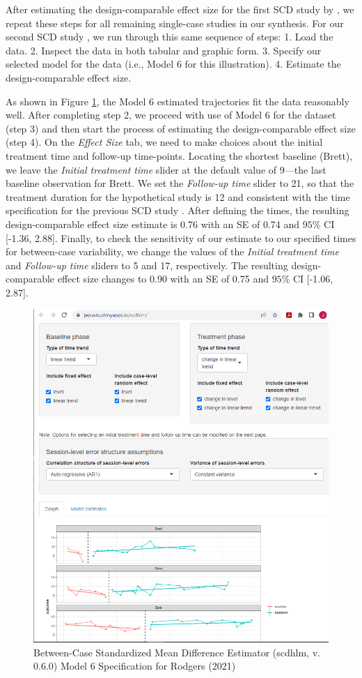 \documentclass[
]{book}
\begin{document}
After estimating the design-comparable effect size for the first SCD study by \citet{datchuk2016Writing}, we repeat these steps for all remaining single-case studies in our synthesis. For our second SCD study \citep{rodgers2021Effects}, we run through this same sequence of steps:
1. Load the data.
2. Inspect the data in both tabular and graphic form.
3. Specify our selected model for the data (i.e., Model 6 for this illustration).
4. Estimate the design-comparable effect size.

As shown in Figure \ref{fig:Rodgers-2021-model6}, the Model 6 estimated trajectories fit the data reasonably well. After completing step 2, we proceed with use of Model 6 for the \citet{rodgers2021Effects} dataset (step 3) and then start the process of estimating the design-comparable effect size (step 4). On the \emph{Effect Size} tab, we need to make choices about the initial treatment time and follow-up time-points. Locating the shortest baseline (Brett), we leave the \emph{Initial treatment time} slider at the default value of 9---the last baseline observation for Brett. We set the \emph{Follow-up time} slider to 21, so that the treatment duration for the hypothetical study is 12 and consistent with the time specification for the previous SCD study \citep{datchuk2016Writing}. After defining the times, the resulting design-comparable effect size estimate is 0.76 with an SE of 0.74 and \(95\%\) CI {[}-1.36, 2.88{]}. Finally, to check the sensitivity of our estimate to our specified times for between-case variability, we change the values of the \emph{Initial treatment time} and \emph{Follow-up time} sliders to 5 and 17, respectively. The resulting design-comparable effect size changes to 0.90 with an SE of 0.75 and \(95\%\) CI {[}-1.06, 2.87{]}.

\begin{figure}
\includegraphics[width=0.6\linewidth]{images/app.model.model6_Rodgers2020} \caption{Between-Case Standardized Mean Difference Estimator (scdhlm, v. 0.6.0) Model 6 Specification for Rodgers (2021)}\label{fig:Rodgers-2021-model6}
\end{figure}
\end{document}
